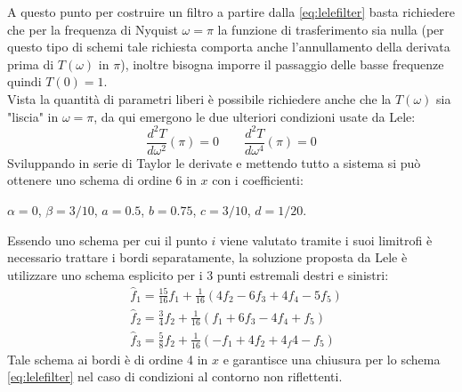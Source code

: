 A questo punto per costruire un filtro a partire dalla \ref{eq:lelefilter} basta richiedere che per la frequenza di Nyquist $\omega = \pi$ la funzione di trasferimento sia nulla (per questo tipo di schemi tale richiesta comporta anche l'annullamento della derivata prima di $T(\omega)$ in $\pi$), inoltre bisogna imporre il passaggio delle basse frequenze quindi $T(0) = 1$.\\
Vista la quantità di parametri liberi è possibile richiedere anche che la $T(\omega)$ sia "liscia" in $\omega = \pi$, da qui emergono le due ulteriori condizioni usate da Lele:
\[
    \frac{d^2T}{d\omega^2}(\pi) = 0  \qquad \frac{d^2T}{d\omega^4}(\pi) = 0
\]
Sviluppando in serie di Taylor le derivate e mettendo tutto a sistema si può ottenere uno schema di ordine 6 in $x$ con i coefficienti:
\begin{center}
$\alpha = 0$, $\beta = 3/10$, $a=0.5$, $b = 0.75$, $c = 3/10$, $d = 1/20$.
\end{center}
Essendo uno schema per cui il punto $i$ viene valutato tramite i suoi limitrofi è necessario trattare i bordi separatamente, la soluzione proposta da Lele è utilizzare uno schema esplicito per i 3 punti estremali destri e sinistri:
\begin{align*}
    &\hat{f}_1 = \frac{15}{16} f_1 + \frac{1}{16}\left(4f_2 - 6f_3 + 4f_4 - 5f_5 \right)\\
    &\hat{f}_2 = \frac{3}{4} f_2 + \frac{1}{16}\left( f_1 + 6f_3 - 4f_4 + f_5\right)\\
    &\hat{f}_3 = \frac{5}{8} f_2 + \frac{1}{16}\left(-f_1 + 4f_2 + 4_f4 - f_5 \right)
\end{align*}
Tale schema ai bordi è di ordine 4 in $x$ e garantisce una chiusura per lo schema \ref{eq:lelefilter} nel caso di condizioni al contorno non riflettenti.
